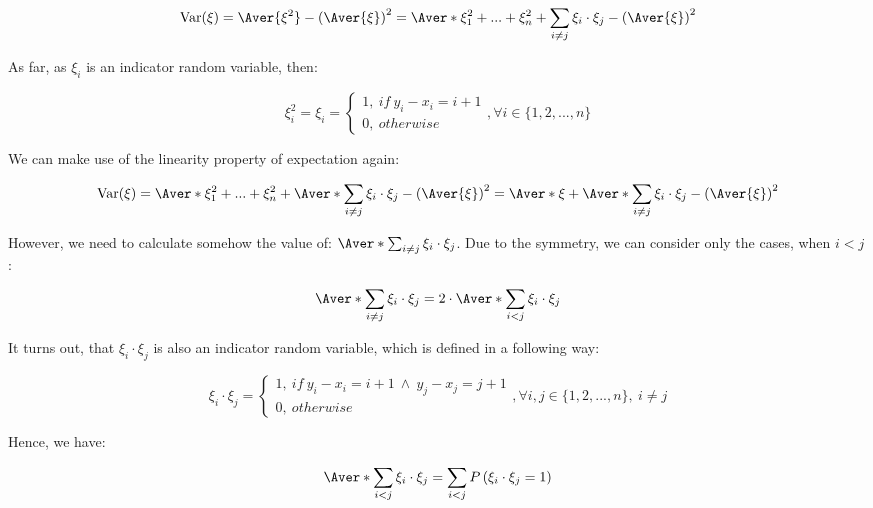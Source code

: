 \documentclass{article}
\newcommand{\Var}{\mathrm{Var}}
\begin{document}
\begin{equation} 
\Var(\xi) = \Aver{\xi^2} - \left( \Aver{\xi} \right)^2 = \Aver*{\xi_1^2 + ... + \xi_n^2 + \sum_{i \neq j}\xi_i \cdot \xi_j} - \left( \Aver{\xi} \right)^2 
\end{equation} 

As far, as $\xi_i$ is an indicator random variable, then:

\begin{equation} 
\xi_i^2 = \xi_i = 
\begin{cases}
1,\ if\ y_i - x_i = i + 1 \\
0,\ otherwise
\end{cases}, \forall i \in \{1, 2, ... , n\}
\end{equation}

We can make use of the linearity property of expectation again: 

\begin{equation} \label{eq:var_linear}
\Var(\xi) = \Aver*{\xi_1^2 + ... + \xi_n^2} + \Aver*{\sum_{i \neq j}\xi_i \cdot \xi_j} - \left( \Aver{\xi} \right)^2 = \Aver*{\xi} + \Aver*{\sum_{i \neq j}\xi_i \cdot \xi_j} - \left( \Aver{\xi} \right)^2
\end{equation} 

However, we need to calculate somehow the value of: $\Aver*{\sum_{i \neq j}\xi_i \cdot \xi_j}$. Due to the symmetry, we can consider only the cases, when $i < j$:

\begin{equation} \label{eq:e_xi_i_xi_j_symmetry}
\Aver*{\sum_{i \neq j}\xi_i \cdot \xi_j} = 2 \cdot \Aver*{\sum_{i < j}\xi_i \cdot \xi_j}
\end{equation}

It turns out, that $\xi_i \cdot \xi_j$ is also an indicator random variable, which is defined in a following way:

\begin{equation} 
\xi_i \cdot \xi_j = 
\begin{cases}
1,\ if\ y_i - x_i = i + 1\ \wedge\  y_j - x_j = j + 1 \\
0,\ otherwise
\end{cases}, \forall i,j \in \{1, 2, ... , n\},\ i \neq j
\end{equation}

Hence, we have:

\begin{equation} \label{eq:expected_xi_i_xi_j}
\Aver*{\sum_{i < j}\xi_i \cdot \xi_j} = \sum_{i < j} P\left( \xi_i \cdot \xi_j = 1 \right)
\end{equation} 
\\
\end{document}
